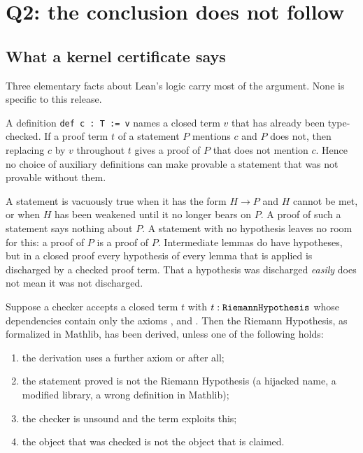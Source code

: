 \section{Q2: the conclusion does not follow}
\label{sec:inference}

\subsection{What a kernel certificate says}
\label{sec:kernel}

Three elementary facts about Lean's logic carry most of the argument. None is specific to this release.

\begin{proposition}\label{prop:cons}
A definition \texttt{def c : T := v} names a closed term $v$ that has already been type-checked. If a proof term $t$ of a statement $P$ mentions $c$ and $P$ does not, then replacing $c$ by $v$ throughout $t$ gives a proof of $P$ that does not mention $c$.
Hence no choice of auxiliary definitions can make provable a statement that was not provable without them.
\end{proposition}

\begin{proposition}\label{prop:vac}
A statement is vacuously true when it has the form $H \to P$ and $H$ cannot be met, or when $H$ has been weakened until it no longer bears on $P$. A proof of such a statement says nothing about $P$.
A statement with no hypothesis leaves no room for this: a proof of $P$ is a proof of $P$.
Intermediate lemmas do have hypotheses, but in a closed proof every hypothesis of every lemma that is applied is discharged by a checked proof term.
That a hypothesis was discharged \emph{easily} does not mean it was not discharged.
\end{proposition}

\begin{proposition}\label{prop:exits}
Suppose a checker accepts a closed term $t$ with $t : \text{\texttt{RiemannHypothesis}}$ whose dependencies contain only the axioms ,  and .
Then the Riemann Hypothesis, as formalized in Mathlib, has been derived, unless one of the following holds:
\begin{enumerate}[label=(\roman*)]
\item the derivation uses a further axiom or  after all;
\item the statement proved is not the Riemann Hypothesis (a hijacked name, a modified library, a wrong definition in Mathlib);
\item the checker is unsound and the term exploits this;
\item the object that was checked is not the object that is claimed.
\end{enumerate}
\end{proposition}

